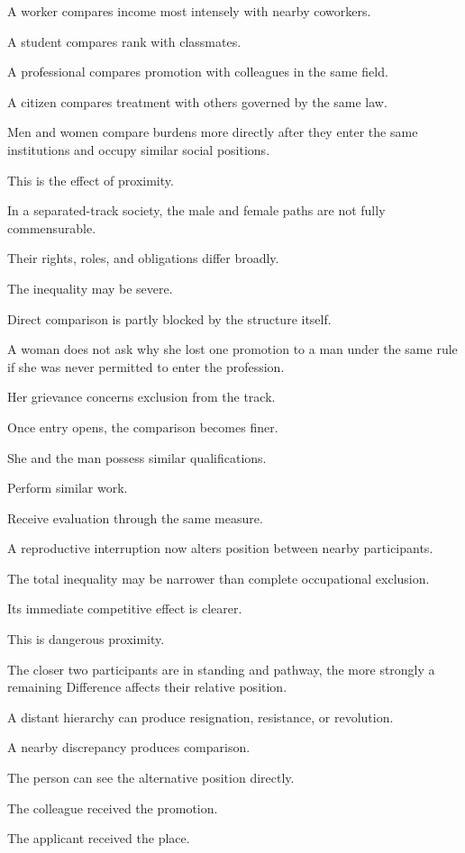 A worker compares income most intensely with nearby coworkers.

A student compares rank with classmates.

A professional compares promotion with colleagues in the same field.

A citizen compares treatment with others governed by the same law.

Men and women compare burdens more directly after they enter the same institutions and occupy similar social positions.

This is the effect of proximity.

In a separated-track society, the male and female paths are not fully commensurable.

Their rights, roles, and obligations differ broadly.

The inequality may be severe.

Direct comparison is partly blocked by the structure itself.

A woman does not ask why she lost one promotion to a man under the same rule if she was never permitted to enter the profession.

Her grievance concerns exclusion from the track.

Once entry opens, the comparison becomes finer.

She and the man possess similar qualifications.

Perform similar work.

Receive evaluation through the same measure.

A reproductive interruption now alters position between nearby participants.

The total inequality may be narrower than complete occupational exclusion.

Its immediate competitive effect is clearer.

This is dangerous proximity.

The closer two participants are in standing and pathway, the more strongly a remaining Difference affects their relative position.

A distant hierarchy can produce resignation, resistance, or revolution.

A nearby discrepancy produces comparison.

The person can see the alternative position directly.

The colleague received the promotion.

The applicant received the place.

